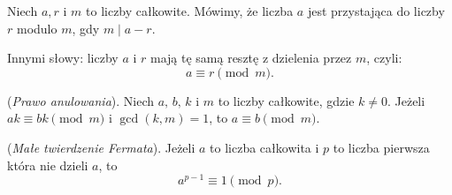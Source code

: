 \begin{definition}
  Niech $a, r$ i $m$ to liczby całkowite. Mówimy, że liczba $a$ jest przystająca
  do liczby $r$ modulo $m$, gdy $m \mid a - r$.

  Innymi słowy: liczby $a$ i $r$
  mają tę samą resztę z dzielenia przez $m$, czyli:
  \[
    a \equiv r \pmod{m}
  .\]
\end{definition}

\begin{theorem}
  (\textit{Prawo anulowania}).
  Niech $a, \, b, \, k$ i $m$ to liczby całkowite, gdzie $k \neq 0$.
  Jeżeli $ak \equiv bk \pmod{m}$ i $\gcd(k, m) = 1$, to $a \equiv b \pmod{m}$.
\end{theorem}

\begin{theorem}
  (\textit{Małe twierdzenie Fermata}). Jeżeli $a$ to liczba całkowita i
  $p$ to liczba pierwsza która nie dzieli $a$, to \[
    a^{p - 1} \equiv 1 \pmod{p}
  .\]
\end{theorem}
